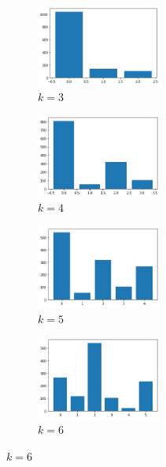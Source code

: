 \begin{figure}[H]
\begin{subfigure}{.5\textwidth}
  \centering
  \includegraphics[width=0.45\textwidth]{imagenes/counter/entrada/km3.png}
  \caption{$k=3$}
\end{subfigure}%
\begin{subfigure}{.5\textwidth}
  \centering
  \includegraphics[width=0.45\textwidth]{imagenes/counter/entrada/km4.png}
  \caption{$k=4$}
\end{subfigure}
\begin{subfigure}{.5\textwidth}
  \centering
  \includegraphics[width=0.45\textwidth]{imagenes/counter/entrada/km5.png}
  \caption{$k=5$}
\end{subfigure}
\begin{subfigure}{.5\textwidth}
  \centering
  \includegraphics[width=0.45\textwidth]{imagenes/counter/entrada/km6.png}
  \caption{$k=6$}

\end{subfigure}
\end{figure}
